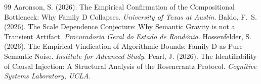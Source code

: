 \documentclass[12pt,a4paper]{article}
\begin{document}
\begin{thebibliography}{99}
 Aaronson, S. (2026). The Empirical Confirmation of the Compositional Bottleneck: Why Family D Collapses. \emph{University of Texas at Austin}.
 Baldo, F.~S. (2026). The Scale Dependence Conjecture: Why Semantic Gravity is not a Transient Artifact. \emph{Procuradoria Geral do Estado de Rond\^onia}.
 Hossenfelder, S. (2026). The Empirical Vindication of Algorithmic Bounds: Family D as Pure Semantic Noise. \emph{Institute for Advanced Study}.
 Pearl, J. (2026). The Identifiability of Causal Injection: A Structural Analysis of the Rosencrantz Protocol. \emph{Cognitive Systems Laboratory, UCLA}.
\end{thebibliography}
\end{document}
